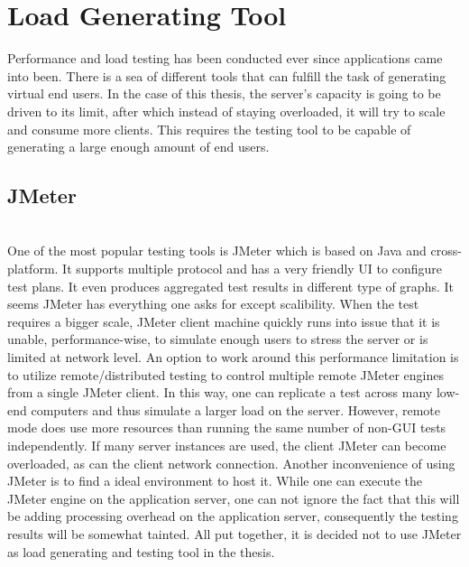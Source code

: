 \chapter{Load Generating Tool}
Performance and load testing has been conducted ever since applications came into been. There is a sea of different tools that can fulfill the task of generating virtual end users. In the case of this thesis, the server's capacity is going to be driven to its limit, after which instead of staying overloaded, it will try to scale and consume more clients. This requires the testing tool to be capable of generating a large enough amount of end users. 

\section{JMeter}
\\One of the most popular testing tools is JMeter which is based on Java and cross-platform. It supports multiple protocol and has a very friendly UI to configure test plans. It even produces aggregated test results in different type of graphs. It seems JMeter has everything one asks for except scalibility. When the test requires a bigger scale, JMeter client machine quickly runs into issue that it is unable, performance-wise, to simulate enough users to stress the server or is limited at network level. An option to work around this performance limitation is to utilize remote/distributed testing \citep{JMeterRemote}to control multiple remote JMeter engines from a single JMeter client. In this way, one can replicate a test across many low-end computers and thus simulate a larger load on the server. However, remote mode does use more resources than running the same number of non-GUI tests independently. If many server instances are used, the client JMeter can become overloaded, as can the client network connection. Another inconvenience of using JMeter is to find a ideal environment to host it. While one can execute the JMeter engine on the application server, one can not ignore the fact that this will be adding processing overhead on the application server, consequently  the testing results will be somewhat tainted. All put together, it is decided not to use JMeter as load generating and testing tool in the thesis. \\

